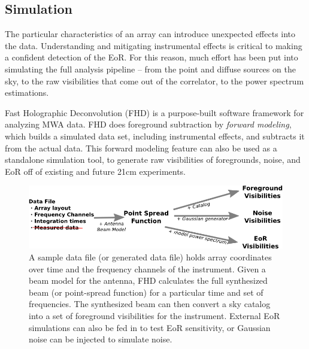 \documentclass[a0,landscape]{a0poster}
\begin{document}
\begin{multicols}{4}

\columnbreak
\section*{Simulation}

The particular characteristics of an array can introduce unexpected effects into the data. Understanding and mitigating instrumental effects is critical to making a confident detection of the EoR. For this reason, much effort has been put into simulating the full analysis pipeline -- from the point and diffuse sources on the sky, to the raw visibilities that come out of the correlator, to the power spectrum estimations.

Fast Holographic Deconvolution (FHD) is a purpose-built software framework for analyzing MWA data. FHD does foreground subtraction by \emph{forward modeling}, which builds a simulated data set, including instrumental effects, and subtracts it from the actual data. This forward modeling feature can also be used as a standalone simulation tool, to generate raw visibilities of foregrounds, noise, and EoR off of existing and future 21cm experiments.

\begin{figure}[H]
\centering
\includegraphics[scale=.9]{figures/sim_flowchart.png}
\caption{A sample data file (or generated data file) holds array coordinates over time and the frequency channels of the instrument. Given a beam model for the antenna, FHD calculates the full synthesized beam (or point-spread function) for a particular time and set of frequencies. The synthesized beam can then convert a sky catalog into a set of foreground visibilities for the instrument. External EoR simulations can also be fed in to test EoR sensitivity, or Gaussian noise can be injected to simulate noise.}
\end{figure}


\end{multicols}
\end{document}
